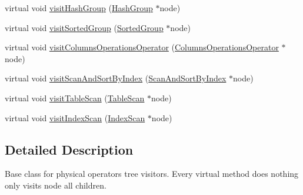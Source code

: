 \begin{DoxyCompactItemize}
\item 
virtual void \hyperlink{classrafe_1_1_physical_operator_visitor_ab6a2b2b02f2237fd41e6c44f5b2ede9b}{visit\+Hash\+Group} (\hyperlink{classrafe_1_1_hash_group}{Hash\+Group} $\ast$node)
\item 
virtual void \hyperlink{classrafe_1_1_physical_operator_visitor_afb1b6786bf12f12e3b1c2895bf77e874}{visit\+Sorted\+Group} (\hyperlink{classrafe_1_1_sorted_group}{Sorted\+Group} $\ast$node)
\item 
virtual void \hyperlink{classrafe_1_1_physical_operator_visitor_ab69b85d7a2c8f89986d84cbcce6f2f89}{visit\+Columns\+Operations\+Operator} (\hyperlink{classrafe_1_1_columns_operations_operator}{Columns\+Operations\+Operator} $\ast$node)
\item 
virtual void \hyperlink{classrafe_1_1_physical_operator_visitor_a4f8cbef9d1c5a58fceb44deb4a7d998c}{visit\+Scan\+And\+Sort\+By\+Index} (\hyperlink{classrafe_1_1_scan_and_sort_by_index}{Scan\+And\+Sort\+By\+Index} $\ast$node)
\item 
virtual void \hyperlink{classrafe_1_1_physical_operator_visitor_ae3d5b2b56e9465713c5ecd4e5fcea9c9}{visit\+Table\+Scan} (\hyperlink{classrafe_1_1_table_scan}{Table\+Scan} $\ast$node)
\item 
virtual void \hyperlink{classrafe_1_1_physical_operator_visitor_ac33ea100cdb3e642a58a82c4367de3fd}{visit\+Index\+Scan} (\hyperlink{classrafe_1_1_index_scan}{Index\+Scan} $\ast$node)
\end{DoxyCompactItemize}


\subsection{Detailed Description}
Base class for physical operators tree visitors. Every virtual method does nothing only visits node all children. 

